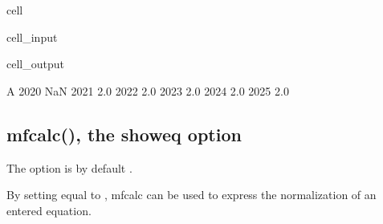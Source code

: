 \documentclass[letterpaper,10pt,english]{jupyterBook}
\begin{document}
\begin{sphinxuseclass}{cell}\begin{sphinxVerbatimInput}

\begin{sphinxuseclass}{cell_input}
\begin{sphinxVerbatim}[commandchars=\\\{\}]
 
\end{sphinxVerbatim}

\end{sphinxuseclass}\end{sphinxVerbatimInput}
\begin{sphinxVerbatimOutput}

\begin{sphinxuseclass}{cell_output}
\begin{sphinxVerbatim}[commandchars=\\\{\}]
        A
2020  NaN
2021  2.0
2022  2.0
2023  2.0
2024  2.0
2025  2.0
\end{sphinxVerbatim}

\end{sphinxuseclass}\end{sphinxVerbatimOutput}

\end{sphinxuseclass}

\subsection{mfcalc(), the showeq option}
\label{\detokenize{content/04_PythonEssentials/ExtendingDataFrames:mfcalc-the-showeq-option}}
\sphinxAtStartPar
The  option is by default .

\sphinxAtStartPar
By setting equal to , mfcalc can be used to express the normalization of an entered equation.
\end{document}
